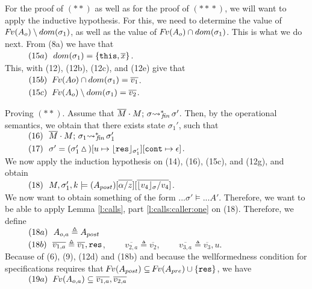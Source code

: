 \begin{description}
For the proof of $(**)$ as well as for the proof of $(*\!*\!*)$, we will want to apply the inductive hypothesis.   For this, we need to determine the value of  
$\fv(\Ao)  \setminus dom(\sigma_1)$, as well as the value of $\fv(\Ao)  \cap dom(\sigma_1)$. 
  This is what we do next. From (8a) we have that\\
$\SPS (15a) \ \  dom(\sigma_1)=\{ \prg{this}, \overline x \}$.\\
This, with (12), (12b), (12c), and (12e)  give  that\\
$\SPS (15b) \ \ \fv(Ao)\cap dom(\sigma_1)= \overline {v_1}$.\\
$\SPS (15c) \ \  \fv(\Ao)  \setminus dom(\sigma_1) = \overline {v_2}$. 

\newcommand{\Aoa}{A_{o,a}}

 \vspace{.3cm}
Proving $(**)$. Assume that   $\leadstoBoundedStarFin  {\Mtwo\cdot M}  {\sigma}  {\sigma'}$. Then, by the operational semantics, we obtain that 
there exists state $\sigma_1'$, such that \\
$\SPS (16) \ \ \leadstoBoundedStarFin  {\Mtwo\cdot M}  {\sigma_1}  {\sigma_1'}$ \\
$\SPS (17) \ \ \sigma'=(\sigma_1'\popSymbol)[u \mapsto {\interpret {\sigma_1'} {\prg{res}}}][\prg{cont}\mapsto \epsilon]$.
\\
We now apply the induction hypothesis on (14), (16), (15c), and (12g), and obtain
\\ 
$\SPS (18) \ \  \satDAssertFrom M  {\sigma_1'} {k}   {(A_{post})[\overline{\alpha/z}][\overline{\interpret {\sigma} {v_4} /v_4}]}$.
\\
We now want to obtain something of the form $...\sigma' \models ...A'$. Therefore, we want to be able to apply   Lemma \ref{l:calls}, part \ref{l:calls:caller:one} on (18). Therefore, we  define
\\
$\SPS (18a) \ \  \Aoa \triangleq  A_{post}$
\\
$\SPS (18b) \ \  \overline {v_{1,a}} \triangleq  \overline {v_1}, \prg{res}$, \ \ \ \ $\overline {v_{2,a}} \triangleq  \overline {v_2}$,   \ \ \ \ 
$\overline {v_{3,a}} \triangleq  \overline {v_3}, u$.
\\
Because of (6),  (9), (12d) and (18b) and because the wellformedness condition for specifications requires that $\fv (A_{post}) \subseteq  \fv (A_{pre}) \cup \{ \prg{res} \}$, we have   \\
$\SPS (19a) \ \  \fv(\Aoa) \subseteq  \overline {v_{1,a}}, \overline {v_{2,a}}$
\\

\end{description}

